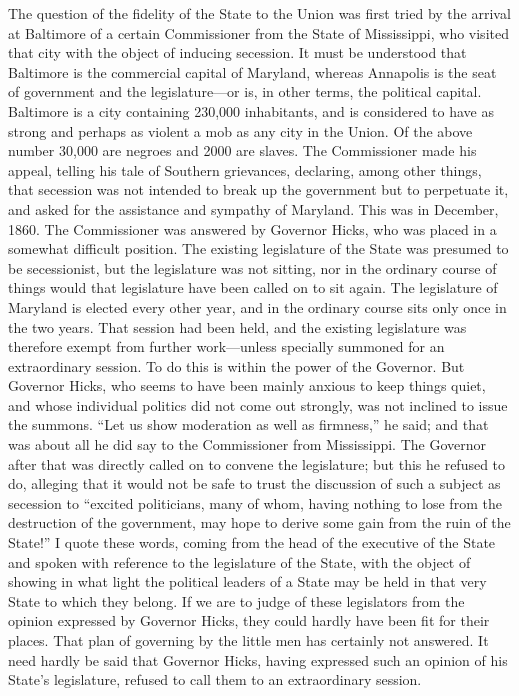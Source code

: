 The question of the fidelity of the State to the Union was first
tried by the arrival at Baltimore of a certain Commissioner from
the State of Mississippi, who visited that city with the object of
inducing secession.  It must be understood that Baltimore is the
commercial capital of Maryland, whereas Annapolis is the seat of
government and the legislature---or is, in other terms, the
political capital.  Baltimore is a city containing 230,000
inhabitants, and is considered to have as strong and perhaps as
violent a mob as any city in the Union.  Of the above number 30,000
are negroes and 2000 are slaves.  The Commissioner made his appeal,
telling his tale of Southern grievances, declaring, among other
things, that secession was not intended to break up the government
but to perpetuate it, and asked for the assistance and sympathy of
Maryland.  This was in December, 1860.  The Commissioner was
answered by Governor Hicks, who was placed in a somewhat difficult
position.  The existing legislature of the State was presumed to be
secessionist, but the legislature was not sitting, nor in the
ordinary course of things would that legislature have been called
on to sit again.  The legislature of Maryland is elected every
other year, and in the ordinary course sits only once in the two
years.  That session had been held, and the existing legislature
was therefore exempt from further work---unless specially summoned
for an extraordinary session.  To do this is within the power of
the Governor.  But Governor Hicks, who seems to have been mainly
anxious to keep things quiet, and whose individual politics did not
come out strongly, was not inclined to issue the summons.  ``Let us
show moderation as well as firmness,'' he said; and that was about
all he did say to the Commissioner from Mississippi.  The Governor
after that was directly called on to convene the legislature; but
this he refused to do, alleging that it would not be safe to trust
the discussion of such a subject as secession to ``excited
politicians, many of whom, having nothing to lose from the
destruction of the government, may hope to derive some gain from
the ruin of the State!''  I quote these words, coming from the head
of the executive of the State and spoken with reference to the
legislature of the State, with the object of showing in what light
the political leaders of a State may be held in that very State to
which they belong.  If we are to judge of these legislators from
the opinion expressed by Governor Hicks, they could hardly have
been fit for their places.  That plan of governing by the little
men has certainly not answered.  It need hardly be said that
Governor Hicks, having expressed such an opinion of his State's
legislature, refused to call them to an extraordinary session.

